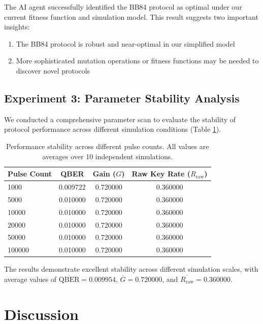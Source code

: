 \documentclass[aps,prl,reprint,superscriptaddress]{revtex4-2}
\newcommand{\qber}{\text{QBER}}
\newcommand{\gain}{G}
\begin{document}
The AI agent successfully identified the BB84 protocol as optimal under our current fitness function and simulation model. This result suggests two important insights:
\begin{enumerate}
    \item The BB84 protocol is robust and near-optimal in our simplified model
    \item More sophisticated mutation operations or fitness functions may be needed to discover novel protocols
\end{enumerate}

\subsection{Experiment 3: Parameter Stability Analysis}
We conducted a comprehensive parameter scan to evaluate the stability of protocol performance across different simulation conditions (Table \ref{tab:parameter_scan}).

\begin{table}[htbp]
\centering
\caption{Performance stability across different pulse counts. All values are averages over 10 independent simulations.}
\begin{tabular}{lccc}
\toprule
\textbf{Pulse Count} & \textbf{QBER} & \textbf{Gain ($\gain$)} & \textbf{Raw Key Rate ($R_{\text{raw}}$)} \\
\midrule
\num{1000} & 0.009722 & 0.720000 & 0.360000 \\
\num{5000} & 0.010000 & 0.720000 & 0.360000 \\
\num{10000} & 0.010000 & 0.720000 & 0.360000 \\
\num{20000} & 0.010000 & 0.720000 & 0.360000 \\
\num{50000} & 0.010000 & 0.720000 & 0.360000 \\
\num{100000} & 0.010000 & 0.720000 & 0.360000 \\
\bottomrule
\end{tabular}
\label{tab:parameter_scan}
\end{table}

The results demonstrate excellent stability across different simulation scales, with average values of $\overline{\qber} = 0.009954$, $\overline{\gain} = 0.720000$, and $\overline{R_{\text{raw}}} = 0.360000$.

\section{Discussion}
\end{document}
